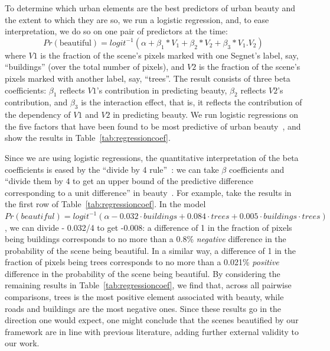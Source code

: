 To determine which urban elements are the best predictors of urban beauty and the extent to which they are so, we run a logistic regression, and, to ease interpretation, we do so on one pair of predictors at the time: 
\begin{equation}
Pr(\textrm{beautiful}) = logit^{-1}(\alpha + \beta_1 * V_1 + \beta_2 * V_2  + \beta_3 * V_{1}.V_{2} )
\label{eq:regression} 
\end{equation}
where $V1$ is the fraction of the scene's pixels marked with one Segnet's label, say, ``buildings'' (over the total number of pixels),  and $V2$ is the fraction of the scene's pixels marked with another label, say, ``trees''. The result consists of three beta coefficients: $\beta_1$ reflects $V1$'s contribution in predicting beauty,  $\beta_2$ reflects $V2$'s contribution, and $\beta_3$ is the interaction effect, that is, it reflects the contribution of the dependency of $V1$ and $V2$ in predicting beauty. We run logistic regressions on the five factors that have been found to be most predictive of urban beauty~\cite{quercia2014aesthetic, ewing2013measuring, alexander1977pattern}, and show the results in Table~\ref{tab:regressioncoef}.


Since we are using logistic regressions, the quantitative interpretation of the beta coefficients is eased by the ``divide by 4 rule''~\cite{vaughn2008data}: we can take $\beta$ coefficients and ``divide them by 4 to get an upper bound of the predictive difference corresponding to a unit difference'' in beauty~\cite{vaughn2008data}. For example, take the results in the first row of Table~\ref{tab:regressioncoef}. In the model $Pr(beautiful) = logit^{-1}(\alpha - 0.032 \cdot buildings + 0.084 \cdot trees + 0.005 \cdot  buildings \cdot trees)$, we can divide - 0.032/4 to get -0.008: a difference of 1 in the fraction of pixels being buildings corresponds to no more than a 0.8\% \emph{negative} difference in the probability of the scene being beautiful. In a similar way, a difference of 1 in the fraction of pixels being trees corresponds to no more than a 0.021\% \emph{positive} difference in the probability of the scene being beautiful. By considering the remaining results in Table~\ref{tab:regressioncoef}, we find that, across all pairwise comparisons, trees is the most positive element associated with beauty, while roads and buildings are the most negative ones. Since these results go in the direction one would expect, one might conclude that the scenes beautified by our framework are in line with previous literature, adding further external validity to our work. 




